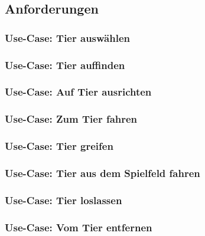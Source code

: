 \subsection{Anforderungen}


\subsubsection{Use-Case: Tier auswählen}

\subsubsection{Use-Case: Tier auffinden}

\subsubsection{Use-Case: Auf Tier ausrichten}

\subsubsection{Use-Case: Zum Tier fahren}

\subsubsection{Use-Case: Tier greifen}

\subsubsection{Use-Case: Tier aus dem Spielfeld fahren}

\subsubsection{Use-Case: Tier loslassen}

\subsubsection{Use-Case: Vom Tier entfernen}